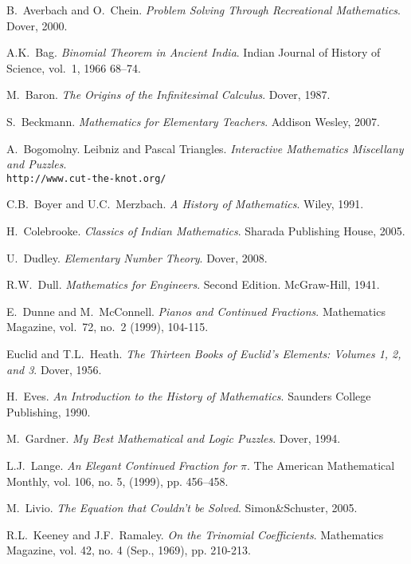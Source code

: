\begin{thebibliography}{99}

 B.\ Averbach and O.\ Chein. \emph{Problem Solving Through Recreational Mathematics}. Dover, 2000.

 A.K.\ Bag. \emph{Binomial Theorem in Ancient India}. Indian Journal of History of Science, vol.\ 1,  1966 68--74. 

 M.\ Baron. \emph{The Origins of the Infinitesimal Calculus}. Dover, 1987.

 S.\ Beckmann. \emph{Mathematics for Elementary
  Teachers}. Addison Wesley, 2007.

 A.\ Bogomolny. Leibniz and Pascal Triangles. \emph{Interactive Mathematics Miscellany and Puzzles}.
\\ \texttt{http://www.cut-the-knot.org/}

 C.B.\ Boyer and U.C.\ Merzbach. \emph{A History of Mathematics}. Wiley, 1991.

 H.\ Colebrooke. \emph{Classics of Indian Mathematics}. 
Sharada Publishing House, 2005.

 U.\ Dudley. \emph{Elementary Number Theory}. Dover,
  2008.

 R.W.\ Dull. \emph{Mathematics for Engineers}. Second
  Edition. McGraw-Hill, 1941.

E.\ Dunne and M.\ McConnell. \emph{Pianos and Continued
Fractions}. Mathematics Magazine, vol.\ 72, no.\ 2 (1999), 104-115.

 Euclid and T.L.\ Heath. \emph{The Thirteen Books of Euclid's Elements: Volumes 1, 2, and 3}. Dover, 1956. 

 H.\ Eves. \emph{An Introduction to the History of Mathematics}. Saunders College Publishing, 1990.

 M.\ Gardner. \emph{My Best Mathematical and Logic
  Puzzles}. Dover, 1994.

 L.J.\ Lange. \emph{An Elegant Continued Fraction for {$\pi$}}. The American Mathematical Monthly, vol. 106, no. 5, (1999), pp. 456--458.

 M.\ Livio. \emph{The Equation that Couldn't be
  Solved}. Simon\&Schuster, 2005.

 R.L.\ Keeney and J.F.\ Ramaley. \emph{On the Trinomial Coefficients}. Mathematics Magazine, vol. 42, no. 4 (Sep., 1969), pp. 210-213.


\end{thebibliography}
